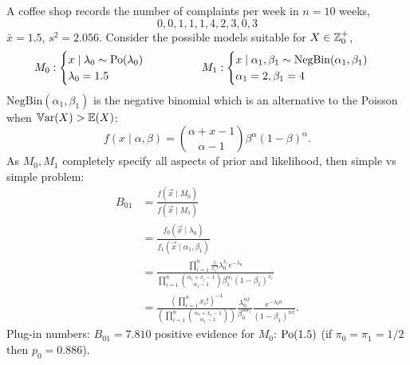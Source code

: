 \documentclass[10pt, a4paper]{article}
\begin{document}
\begin{example}
    A coffee shop records the number of complaints per week in $n = 10$ weeks,
    \[
    0, 0, 1, 1, 1, 4, 2, 3, 0, 3
    \]
    $\bar{x} = 1.5$,
    $s ^ 2 = 2.056$.
    Consider the possible models suitable for $X \in \mathbb{Z}_{0}^{+}$,
    \[
    M_0 : \begin{cases}
        x \mid \lambda_0 \sim \operatorname{Po}(\lambda_0) \\
        \lambda_0 = 1.5
    \end{cases}\qquad\qquad
    M_1 : \begin{cases}
        x \mid \alpha_1, \beta_1 \sim \mathrm{NegBin}(\alpha_1, \beta_1) \\
        \alpha_1 = 2, \beta_1 = 4
    \end{cases}
    \]
    $\mathrm{NegBin}(\alpha_1, \beta_1)$ is the negative binomial which is an alternative to the Poisson when $\mathbb{V}\mathrm{ar}(X) > \mathbb{E}(X)$:
    \[
    f(x \mid \alpha, \beta) = \binom{\alpha + x - 1}{\alpha - 1}\beta ^ {\alpha}(1 - \beta) ^ {\alpha}.
    \]
    As $M_0, M_1$ completely specify all aspects of prior and likelihood,
    then simple vs simple problem:
    \begin{align*}
        B_{01} &= \frac{f(\vec{x} \mid M_0)}{f(\vec{x} \mid M_1)} \\
        &= \frac{f_0(\vec{x} \mid \lambda_0)}{f_1(\vec{x} \mid \alpha_1, \beta_1)} \\
        &= \frac{\prod_{i = 1}^{n}\frac{1}{x_i!}\lambda_0 ^ {x_i}e ^ {-\lambda_0}}{\prod_{i = 1}^{n}\binom{\alpha_1 + x_i - 1}{\alpha_1 - 1}\beta_1 ^ {\alpha_1}(1 - \beta_1) ^ {x_i}} \\
        &= \frac{\left(\prod_{i = 1}^{n}x_i!\right) ^ {-1}}{\left(\prod_{i = 1}^{n}\binom{\alpha_1 + x_i - 1}{\alpha_1 - 1}\right)}\frac{\lambda_0 ^ {n\bar{x}}}{\beta_0 ^ {n\alpha_1}}\frac{e ^ {-\lambda_0n}}{(1 - \beta_1) ^ {n\bar{x}}}.
    \end{align*}
    Plug-in numbers:
    $B_{01} = 7.810$ positive evidence for $M_0$:
    $\operatorname{Po}(1.5)$
    (if $\pi_0 = \pi_1 = 1 / 2$ then $p_0 = 0.886$).
    \[
    \]
\end{example}
\end{document}
